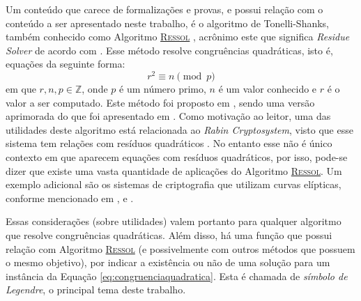 Um conteúdo que carece de formalizações e provas, e possui relação com o conteúdo a ser apresentado neste trabalho, é o algoritmo de Tonelli-Shanks, também conhecido como Algoritmo \hyperref[algo:ressol]{\textsc{Ressol}} \cite{Huynh1581080}, acrônimo este que significa \textit{Residue Solver} de acordo com \cite{Niven1915}. Esse método resolve congruências quadráticas, isto é, equações da seguinte forma:
\begin{equation}
    \label{eq:congruenciaquadratica}
    r^2 \equiv n \pmod p
\end{equation}
em que $r, n, p \in \mathbb{Z}$, onde $p$ é um número primo, $n$ é um valor conhecido e $r$ é o valor a ser computado. Este método foi proposto em , sendo uma versão aprimorada do que foi apresentado em \cite{Tonelli1891}.
Como motivação ao leitor, uma das utilidades deste algoritmo está relacionada ao \textit{Rabin Cryptosystem}, visto que esse sistema tem relações com resíduos quadráticos \cite{Huynh1581080}. No entanto esse não é único contexto em que aparecem equações com resíduos quadráticos, por isso, pode-se dizer que existe uma vasta quantidade de aplicações do Algoritmo \hyperref[algo:ressol]{\textsc{Ressol}}. Um exemplo adicional são os sistemas de criptografia que utilizam curvas elípticas, conforme mencionado em \cite{PalashSarkar2024AdvancesinMathematicsofCommunications}, \cite{kumar2021algorithm} e \cite{7133812}. 

Essas considerações (sobre utilidades) valem portanto para qualquer algoritmo que resolve congruências quadráticas. Além disso, há uma função que possui relação com Algoritmo \hyperref[algo:ressol]{\textsc{Ressol}} (e possivelmente com outros métodos que possuem o mesmo objetivo), por indicar a existência ou não de uma solução para um instância da Equação \ref{eq:congruenciaquadratica}. Esta é chamada de \textit{símbolo de Legendre}, o principal tema deste trabalho.



